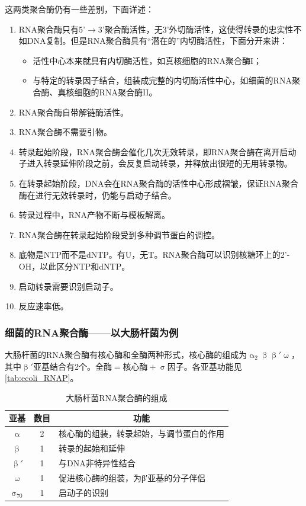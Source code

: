 这两类聚合酶仍有一些差别，下面详述：
\begin{enumerate}
	\item RNA聚合酶只有5'$\longrightarrow$3'聚合酶活性，无3'外切酶活性，这使得转录的忠实性不如DNA复制。但是RNA聚合酶具有“潜在的”内切酶活性，下面分开来讲：
	\begin{itemize}
		\item 活性中心本来就具有内切酶活性，如真核细胞的RNA聚合酶I；
		\item 与特定的转录因子结合，组装成完整的内切酶活性中心，如细菌的RNA聚合酶、真核细胞的RNA聚合酶II。
	\end{itemize}
	\item RNA聚合酶自带解链酶活性。
	\item RNA聚合酶不需要引物。
	\item 转录起始阶段，RNA聚合酶会催化几次无效转录，即RNA聚合酶在离开启动子进入转录延伸阶段之前，会反复启动转录，并释放出很短的无用转录物。
	\item 在转录起始阶段，DNA会在RNA聚合酶的活性中心形成褶皱，保证RNA聚合酶在进行无效转录时，仍能与启动子结合。
	\item 转录过程中，RNA产物不断与模板解离。
	\item RNA聚合酶在转录起始阶段受到多种调节蛋白的调控。
	\item 底物是NTP而不是dNTP。有U，无T。RNA聚合酶可以识别核糖环上的2'-OH，以此区分NTP和dNTP。
	\item 启动转录需要识别启动子。
	\item 反应速率低。
\end{enumerate}

\subsubsection{细菌的RNA聚合酶——以大肠杆菌为例}

大肠杆菌的RNA聚合酶有核心酶和全酶两种形式，核心酶的组成为$\upalpha_2\upbeta\upbeta'\upomega$，其中$\upbeta'$亚基结合有2个。$\text{全酶}=\text{核心酶} + \upsigma\text{因子}$。各亚基功能见\autoref{tab:ecoli_RNAP}。

\begin{table}[htbp]
	\centering
	\begin{tabularx}{\textwidth}{|c|c|X|}
		\hline
		\textbf{亚基} & 数目 & \multicolumn{1}{c|}{\textbf{功能}} \\ \hline
		$\upalpha$ & 2 & 核心酶的组装，转录起始，与调节蛋白的作用 \\ \hline
		$\upbeta$ & 1 & 转录的起始和延伸 \\ \hline
		$\upbeta'$ & 1 & 与DNA非特异性结合 \\ \hline
		$\upomega$ & 1 & 促进核心酶的组装，为β′亚基的分子伴侣 \\ \hline
		$\upsigma_{70}$ & 1 & 启动子的识别 \\ \hline
	\end{tabularx}
	\caption{大肠杆菌RNA聚合酶的组成}
	\label{tab:ecoli_RNAP}
\end{table}

